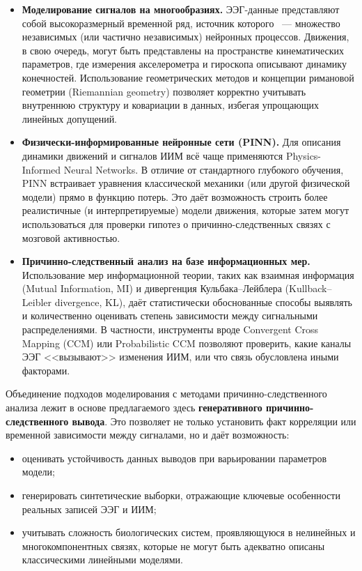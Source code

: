 \documentclass[a4paper, 12pt]{article}
\begin{document}
	\begin{itemize}
		\item \textbf{Моделирование сигналов на многообразиях.}
		ЭЭГ-данные представляют собой высокоразмерный временной ряд, источник которого ~--- множество независимых (или частично независимых) нейронных процессов. Движения, в свою очередь, могут быть представлены на пространстве кинематических параметров, где измерения акселерометра и гироскопа описывают динамику конечностей. Использование геометрических методов и концепции римановой геометрии (Riemannian geometry) позволяет корректно учитывать внутреннюю структуру и ковариации в данных, избегая упрощающих линейных допущений.
		
		\item \textbf{Физически-информированные нейронные сети (PINN).}
		Для описания динамики движений и сигналов ИИМ всё чаще применяются Physics-Informed Neural Networks. В отличие от стандартного глубокого обучения, PINN встраивает уравнения классической механики (или другой физической модели) прямо в функцию потерь. Это даёт возможность строить более реалистичные (и интерпретируемые) модели движения, которые затем могут использоваться для проверки гипотез о причинно-следственных связях с мозговой активностью.
		
		\item \textbf{Причинно-следственный анализ на базе информационных мер.}
		Использование мер информационной теории, таких как взаимная информация (Mutual Information, MI) и дивергенция Кульбака--Лейблера (Kullback--Leibler divergence, KL), даёт статистически обоснованные способы выявлять и количественно оценивать степень зависимости между сигнальными распределениями. В частности, инструменты вроде Convergent Cross Mapping (CCM) или Probabilistic CCM позволяют проверить, какие каналы ЭЭГ <<вызывают>> изменения ИИМ, или что связь обусловлена иными факторами.
	\end{itemize}
	
	Объединение подходов моделирования с методами причинно-следственного анализа  лежит в основе предлагаемого здесь \textbf{генеративного причинно-следственного вывода}. Это позволяет не только установить факт корреляции или временной зависимости между сигналами, но и даёт возможность:
	
	\begin{itemize}
		\item оценивать устойчивость данных выводов при варьировании параметров модели;
		\item генерировать синтетические выборки, отражающие ключевые особенности реальных записей ЭЭГ и ИИМ;
		\item учитывать сложность биологических систем, проявляющуюся в нелинейных и многокомпонентных связях, которые не могут быть адекватно описаны классическими линейными моделями.
	\end{itemize}
	
\end{document}
